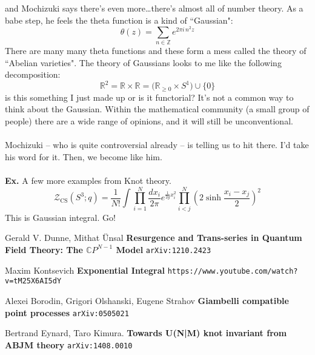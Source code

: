 \documentclass[12pt]{article}
\begin{document}
and Mochizuki says there's even more\dots there's almost all of number theory.  As a babe step, he feels the theta function is a kind of ``Gaussian":
$$ \theta(z) = \sum_{n \in \mathbb{Z}} e^{2\pi i \, n^2 z}  $$
There are many many theta functions and these form a mess called the theory of ``Abelian varieties".  The theory of Gaussians looks to me like the following decomposition:
$$ \mathbb{R}^2 = \mathbb{R} \times \mathbb{R} 
= \Big( \mathbb{R}_{\geq 0} \times S^1 \Big)  \cup \{ 0 \} $$
is this something I just made up or is it functorial?  It's not a common way to think about the Gaussian.  Within the mathematical community (a small group of people) there are a wide range of opinions, and it will still be unconventional. \\ \\
Mochizuki -- who is quite controversial already -- is telling us to hit there.  I'd take his word for it. Then, we become like him. \\ \\
\textbf{Ex.} A few more examples from Knot theory.
$$
\mathcal{Z}_{\text{CS}}(S^3; q)
= \frac{1}{N!} \int \prod_{i=1}^N
\frac{dx_i}{2\pi} e^{\frac{1}{2g}x_i^2}\prod_{i < j}^N \left( 2 \sinh \frac{x_i - x_j}{2} \right)^2 $$
This is Gaussian integral.  Go!
\vfill

\begin{thebibliography}{}

\item Gerald V. Dunne, Mithat \"{U}nsal  \textbf{Resurgence and Trans-series in Quantum Field Theory: The $\mathbb{C}P^{N-1}$ Model} \texttt{arXiv:1210.2423}

\item Maxim Kontsevich \textbf{Exponential Integral} \texttt{https://www.youtube.com/watch?v=tM25X6AI5dY}
 
\end{thebibliography}

\begin{thebibliography}{}

\item Alexei Borodin, Grigori Olshanski, Eugene Strahov \textbf{Giambelli compatible point processes}
\texttt{arXiv:0505021}

\item Bertrand Eynard, Taro Kimura. \textbf{Towards U(N|M) knot invariant from ABJM theory
}
\texttt{arXiv:1408.0010}

\end{thebibliography}
\end{document}
